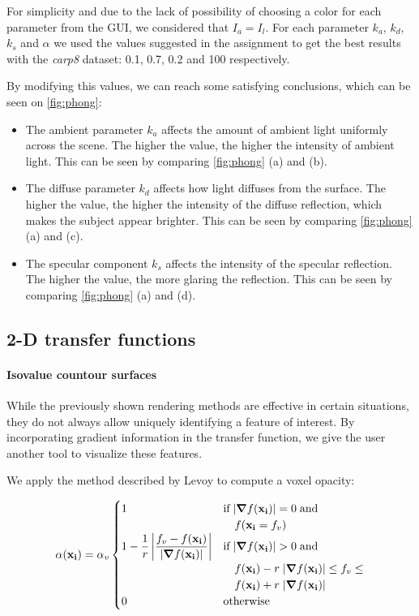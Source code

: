 \documentclass[a4paper]{article}
\begin{document}
For simplicity and due to the lack of possibility of choosing a color for each parameter from the GUI, we considered that $I_a=I_l$. For each parameter $k_a$, $k_d$, $k_s$ and $\alpha$ we used the values suggested in the assignment to get the best results with the \textit{carp8} dataset: 0.1, 0.7, 0.2 and 100 respectively.

By modifying this values, we can reach some satisfying conclusions, which can be seen on \autoref{fig:phong}:
\begin{itemize}[noitemsep]
  \item The ambient parameter $k_a$ affects the amount of ambient light uniformly across the scene. The higher the value, the higher the intensity of ambient light. This can be seen by comparing \autoref{fig:phong} (a) and (b).
  \item The diffuse parameter $k_d$ affects how light diffuses from the surface. The higher the value, the higher the intensity of the diffuse reflection, which makes the subject appear brighter. This can be seen by comparing \autoref{fig:phong} (a) and (c).
  \item The specular component $k_s$ affects the intensity of the specular reflection. The higher the value, the more glaring the reflection. This can be seen by comparing \autoref{fig:phong} (a) and (d).
\end{itemize}

\subsection{2-D transfer functions}

\paragraph{Isovalue countour surfaces}

While the previously shown rendering methods are effective in certain situations, they do not always allow uniquely identifying a feature of interest. By incorporating gradient information in the transfer function, we give the user another tool to visualize these features.

We apply the method described by Levoy\citep{levoy_1988} to compute a voxel opacity:

\begin{equation*}
\alpha(\vb{x_i}) = \alpha_v
\begin{cases}
  1 &\text{if}\;|\grad f(\vb{x_i})| = 0\;\text{and}\\
  &\quad f(\vb{x_i} = f_v)\\
  1 - \dfrac{1}{r} \left| \dfrac{f_v - f(\vb{x_i})}{|\grad f(\vb{x_i})|}\right| &\text{if}\; |\grad f(\vb{x_i})| > 0\;\text{and}\;\\
  &\quad f(\vb{x_i}) - r\; |\grad f(\vb{x_i})| \leq f_v \leq\\
  &\quad f(\vb{x_i}) + r\; |\grad f(\vb{x_i})|\\
  0 &\text{otherwise}
\end{cases}
\end{equation*}
\end{document}
